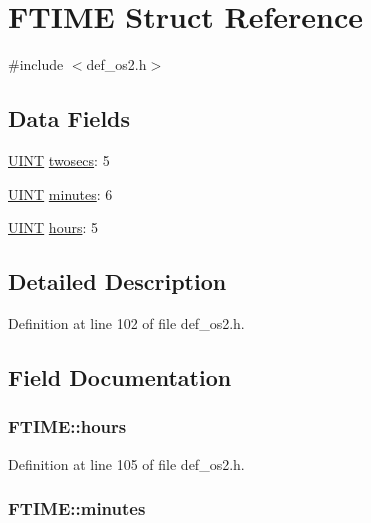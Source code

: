 \hypertarget{structFTIME}{\section{F\+T\+I\+M\+E Struct Reference}
\label{structFTIME}
}


{\ttfamily \#include $<$def\+\_\+os2.\+h$>$}

\subsection*{Data Fields}
\begin{DoxyCompactItemize}
\item 
\hyperlink{def__os2_8h_a36cb3b01d81ffd844bbbfb54003e06ec}{U\+I\+N\+T} \hyperlink{structFTIME_ac2d7f6ea59ca1edbb4b4ae035f4a8d5b}{twosecs}\+: 5
\item 
\hyperlink{def__os2_8h_a36cb3b01d81ffd844bbbfb54003e06ec}{U\+I\+N\+T} \hyperlink{structFTIME_a92d149ebbef8b4df135451ad536d2dc1}{minutes}\+: 6
\item 
\hyperlink{def__os2_8h_a36cb3b01d81ffd844bbbfb54003e06ec}{U\+I\+N\+T} \hyperlink{structFTIME_a52720106987d4be93903cc081c990ced}{hours}\+: 5
\end{DoxyCompactItemize}


\subsection{Detailed Description}


Definition at line 102 of file def\+\_\+os2.\+h.



\subsection{Field Documentation}
\hypertarget{structFTIME_a52720106987d4be93903cc081c990ced}{
\subsubsection[{hours}]{ F\+T\+I\+M\+E\+::hours}}\label{structFTIME_a52720106987d4be93903cc081c990ced}


Definition at line 105 of file def\+\_\+os2.\+h.

\hypertarget{structFTIME_a92d149ebbef8b4df135451ad536d2dc1}{
\subsubsection[{minutes}]{ F\+T\+I\+M\+E\+::minutes}}\label{structFTIME_a92d149ebbef8b4df135451ad536d2dc1}


